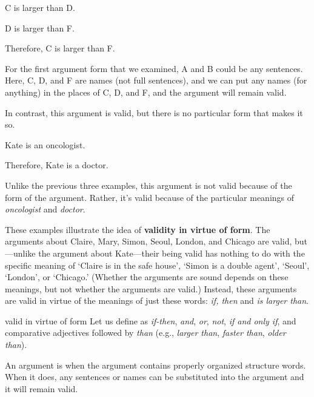 	\noindent\begin{minipage}{0.99\textwidth}
	\begin{earg}
		\item[1.] C is larger than D.
		\item[2.] D is larger than F.
		\item[3.] Therefore, C is larger than F. 
	\end{earg}
	\end{minipage}

\noindent For the first argument form that we examined, A and B could be any sentences. Here, C, D, and F are names (not full sentences), and we can put any names (for anything) in the places of C, D, and F, and the argument will remain valid.

In contrast, this argument is valid, but there is no particular form that makes it so.
	\begin{earg}
		\item[1.] Kate is an oncologist.
		\item[2.] Therefore, Kate is a doctor.
	\end{earg}
Unlike the previous three examples, this argument is not valid because of the form of the argument. Rather, it's valid because of the particular meanings of \textit{oncologist} and \textit{doctor}. 

These examples illustrate the idea of \textbf{validity in virtue of form}. The arguments about Claire, Mary, Simon, Seoul, London, and Chicago are valid, but---unlike the argument about Kate---their being valid has nothing to do with the specific meaning of `Claire is in the safe house', `Simon is a double agent', `Seoul', `London', or `Chicago.' (Whether the arguments are sound depends on these meanings, but not whether the arguments are valid.) Instead, these arguments are valid in virtue of the meanings of just these words: \textit{if, then} and \textit{is larger than}.

\begin{factboxy}{valid in virtue of form}
Let us define  as \textit{if-then}, \textit{and}, \textit{or}, \textit{not}, \textit{if and only if}, and comparative adjectives followed by \textit{than} (e.g., \textit{larger than}, \textit{faster than}, \textit{older than}).

An argument is  when the argument contains properly organized structure words. When it does, any sentences or names can be substituted into the argument and it will remain valid. 
\end{factboxy}

